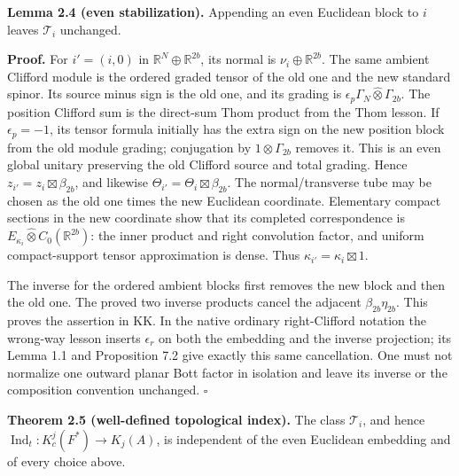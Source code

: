 \documentclass[
  11pt,
]{article}
\begin{document}
\textbf{Lemma 2.4 (even stabilization).} Appending an even Euclidean
block to \(i\) leaves \(\mathcal T_i\) unchanged.

\textbf{Proof.} For \(i'=(i,0)\) in \(\mathbb R^N\oplus\mathbb R^{2b}\),
its normal is \(\nu_i\oplus\mathbb R^{2b}\). The same ambient Clifford
module is the ordered graded tensor of the old one and the new standard
spinor. Its source minus sign is the old one, and its grading is
\(\epsilon_p\Gamma_N\widehat\otimes\Gamma_{2b}\). The position Clifford
sum is the direct-sum Thom product from the Thom lesson. If
\(\epsilon_p=-1\), its tensor formula initially has the extra sign on
the new position block from the old module grading; conjugation by
\(1\otimes\Gamma_{2b}\) removes it. This is an even global unitary
preserving the old Clifford source and total grading. Hence
\(z_{i'}=z_i\boxtimes\beta_{2b}\), and likewise
\(\Theta_{i'}=\Theta_i\boxtimes\beta_{2b}\). The normal/transverse tube
may be chosen as the old one times the new Euclidean coordinate.
Elementary compact sections in the new coordinate show that its
completed correspondence is
\(E_{\kappa_i}\widehat\otimes C_0(\mathbb R^{2b})\): the inner product
and right convolution factor, and uniform compact-support tensor
approximation is dense. Thus \(\kappa_{i'}=\kappa_i\boxtimes1\).

The inverse for the ordered ambient blocks first removes the new block
and then the old one. The proved two inverse products cancel the
adjacent \(\beta_{2b}\eta_{2b}\). This proves the assertion in KK. In
the native ordinary right-Clifford notation the wrong-way lesson inserts
\(\epsilon_r\) on both the embedding and the inverse projection; its
Lemma 1.1 and Proposition 7.2 give exactly this same cancellation. One
must not normalize one outward planar Bott factor in isolation and leave
its inverse or the composition convention unchanged. \(\square\)

\textbf{Theorem 2.5 (well-defined topological index).} The class
\(\mathcal T_i\), and hence
\(\operatorname{Ind}_t:K_c^j(F^*)\to K_j(A)\), is independent of the
even Euclidean embedding and of every choice above.
\end{document}
